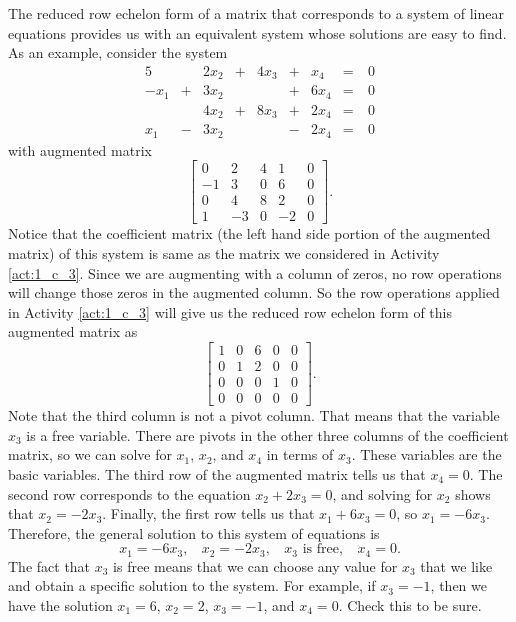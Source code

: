 The reduced row echelon form of a matrix that corresponds to a system of linear equations provides us with an equivalent system whose solutions are easy to find. As an example, consider the system 
\begin{alignat*}{5}
{} 		&{}	 	&{2}x_2	&{}+{}	&{4}x_3	&{}+{}	&{}x_4	&{}={}	& \ 0   \\
{-}x_1	&{}+{}	&{3}x_2	&{}		&{}		&{}+{}	&{6}x_4	&{}={} 	& \ 0 \\
{}			&{}		&{4}x_2	&{}+{} 	&{8}x_3	&{}+{}	&{2}x_4	&{}={} 	& \ 0 \\
{}x_1	&{}-{}	&{3}x_2	&{}	 	&{}		&{}-{}	&{2}x_4	&{}={} 	& \ 0 
\end{alignat*}
with augmented matrix 
\[\left[ \begin{array}{rrcr|c} 0&2&4&1&0 \\ -1&3&0&6&0 \\ 0&4&8&2&0 \\ 1&-3&0&-2&0 \end{array}  \right].\]
Notice that the coefficient matrix (the left hand side portion of the augmented matrix) of this system is same as the matrix we considered in Activity \ref{act:1_c_3}. Since we are augmenting with a column of zeros, no row operations will change those zeros in the augmented column. So the row operations applied in Activity \ref{act:1_c_3} will give us the reduced row echelon form of this augmented matrix as 
\[\left[ \begin{array}{cccc|c} 1&0&6&0&0\\ 0&1&2&0&0 \\ 0&0&0&1&0 \\ 0&0&0&0&0 \end{array} \right].\]
Note that the third column is not a pivot column. That means that the variable $x_3$ is a free variable. There are pivots in the other three columns of the coefficient matrix, so we can solve for $x_1$, $x_2$, and $x_4$ in terms of $x_3$. These variables are the basic variables. The third row of the augmented matrix tells us that $x_4=0$. The second row corresponds to the equation $x_2+2x_3 = 0$, and solving for $x_2$ shows that $x_2 = -2x_3$. Finally, the first row tells us that $x_1+6x_3 = 0$, so $x_1 = -6x_3$. Therefore, the general solution to this system of equations is 
\[x_1 = -6x_3, \ \ \ \ x_2 = -2x_3, \ \ \ \ x_3 \text{ is free}, \ \ \ \  x_4 = 0.\]
The fact that $x_3$ is free means that we can choose any value for $x_3$ that we like and obtain a specific solution to the system. For example, if $x_3=-1$, then we have the solution $x_1 = 6$, $x_2 = 2$, $x_3 = -1$, and $x_4 = 0$. Check this to be sure. 

